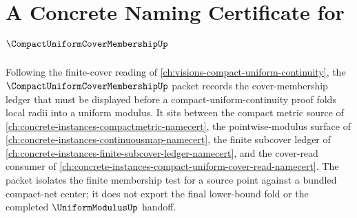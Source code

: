 \chapter{A Concrete Naming Certificate for $\CompactUniformCoverMembershipUp$}
\label{ch:concrete-instances-compact-uniform-cover-membership-namecert}

Following the finite-cover reading of \autoref{ch:visions-compact-uniform-continuity}, the $\CompactUniformCoverMembershipUp$ packet records the cover-membership ledger that must be displayed before a compact-uniform-continuity proof folds local radii into a uniform modulus. It sits between the compact metric source of \autoref{ch:concrete-instances-compactmetric-namecert}, the pointwise-modulus surface of \autoref{ch:concrete-instances-continuousmap-namecert}, the finite subcover ledger of \autoref{ch:concrete-instances-finite-subcover-ledger-namecert}, and the cover-read consumer of \autoref{ch:concrete-instances-compact-uniform-cover-read-namecert}. The packet isolates the finite membership test for a source point against a bundled compact-net center; it does not export the final lower-bound fold or the completed $\UniformModulusUp$ handoff.

